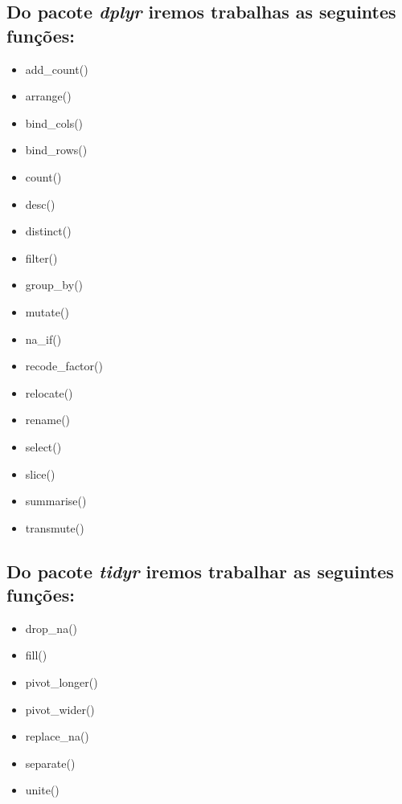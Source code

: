 \documentclass[]{book}
\providecommand{\tightlist}{%
  \setlength{\itemsep}{0pt}\setlength{\parskip}{0pt}}
\begin{document}
\hypertarget{do-pacote-dplyr-iremos-trabalhas-as-seguintes-funuxe7uxf5es}{%
\subsection{\texorpdfstring{Do pacote \emph{dplyr} iremos trabalhas as seguintes funções:}{Do pacote dplyr iremos trabalhas as seguintes funções:}}\label{do-pacote-dplyr-iremos-trabalhas-as-seguintes-funuxe7uxf5es}}

\begin{itemize}
\tightlist
\item
  add\_count()
\item
  arrange()
\item
  bind\_cols()
\item
  bind\_rows()
\item
  count()
\item
  desc()
\item
  distinct()
\item
  filter()
\item
  group\_by()
\item
  mutate()
\item
  na\_if()
\item
  recode\_factor()
\item
  relocate()
\item
  rename()
\item
  select()
\item
  slice()
\item
  summarise()
\item
  transmute()
\end{itemize}

\hypertarget{do-pacote-tidyr-iremos-trabalhar-as-seguintes-funuxe7uxf5es}{%
\subsection{\texorpdfstring{Do pacote \emph{tidyr} iremos trabalhar as seguintes funções:}{Do pacote tidyr iremos trabalhar as seguintes funções:}}\label{do-pacote-tidyr-iremos-trabalhar-as-seguintes-funuxe7uxf5es}}

\begin{itemize}
\tightlist
\item
  drop\_na()
\item
  fill()
\item
  pivot\_longer()
\item
  pivot\_wider()
\item
  replace\_na()
\item
  separate()
\item
  unite()
\end{itemize}
\end{document}
